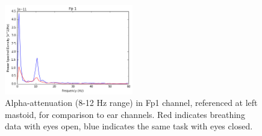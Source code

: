 \documentclass[11pt]{article}
\begin{document}
\begin{figure}[h]
\centering
\includegraphics[width=0.5\textwidth]{001_AlphaAtt_Fp1.jpg}
\caption{Alpha-attenuation (8-12 Hz range) in Fp1 channel, referenced at left mastoid, for comparison to ear channels. Red indicates breathing data with
eyes open, blue indicates the same task with eyes closed.}
\end{figure}
\end{document}

